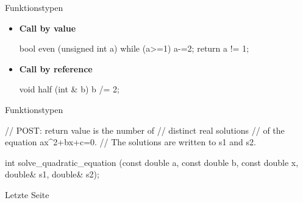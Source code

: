 \ifnum\conditionmacro=1 \documentclass[handout,usenames,dvipsnames]{beamer}\fi
\begin{document}
\begin{frame}[fragile]{Funktionstypen}
\begin{itemize}
\item \textbf{Call by value}

\begin{TPCpp}
bool even (unsigned int a){
	while (a>=1) a-=2;
	return a != 1;
}
\end{TPCpp}

\item \textbf{Call by reference}

\begin{TPCpp}
void half (int & b){
	b /= 2;
}
\end{TPCpp}
\end{itemize}
\end{frame}

\begin{frame}[fragile]{Funktionstypen}
\begin{TFCpp}
// POST:	return value is the number of 
//			distinct real solutions
//			of the equation ax^2+bx+c=0.
//			The solutions are written to s1 and s2.

int solve_quadratic_equation (const double a, const double b, const double x, double& s1, double& s2);
\end{TFCpp}
\end{frame}


\begin{frame}{Letzte Seite}
\end{frame}
\end{document}

